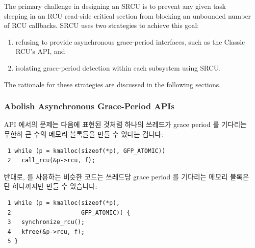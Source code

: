 The primary challenge in designing an SRCU
is to prevent any given task sleeping in an RCU read-side
critical section from blocking an unbounded number of RCU callbacks.
SRCU uses two strategies to achieve this goal:
\begin{enumerate}
\item	refusing to provide asynchronous grace-period interfaces,
	such as the Classic RCU's  API, and
\item	isolating grace-period detection within each subsystem using SRCU.
\end{enumerate}
The rationale for these strategies are discussed in the following sections.
\fi

\subsubsection{Abolish Asynchronous Grace-Period APIs}
\label{sec:app:rcuimpl:Abolish Asynchronous Grace-Period APIs}

 API 에서의 문제는 다음에 표현된 것처럼 하나의 쓰레드가 grace
period 를 기다리는 무한히 큰 수의 메모리 블록들을 만들 수 있다는 겁니다:

\vspace{5pt}
\begin{minipage}[t]{\columnwidth}
\scriptsize
\begin{verbatim}
 1 while (p = kmalloc(sizeof(*p), GFP_ATOMIC))
 2   call_rcu(&p->rcu, f);
\end{verbatim}
\end{minipage}
\vspace{5pt}

반대로,  를 사용하는 비슷한 코드는 쓰레드당 grace period
를 기다리는 메모리 블록은 단 하나까지만 만들 수 있습니다:

\vspace{5pt}
\begin{minipage}[t]{\columnwidth}
\scriptsize
\begin{verbatim}
 1 while (p = kmalloc(sizeof(*p),
 2                    GFP_ATOMIC)) {
 3   synchronize_rcu();
 4   kfree(&p->rcu, f);
 5 }
\end{verbatim}
\end{minipage}
\vspace{5pt}

